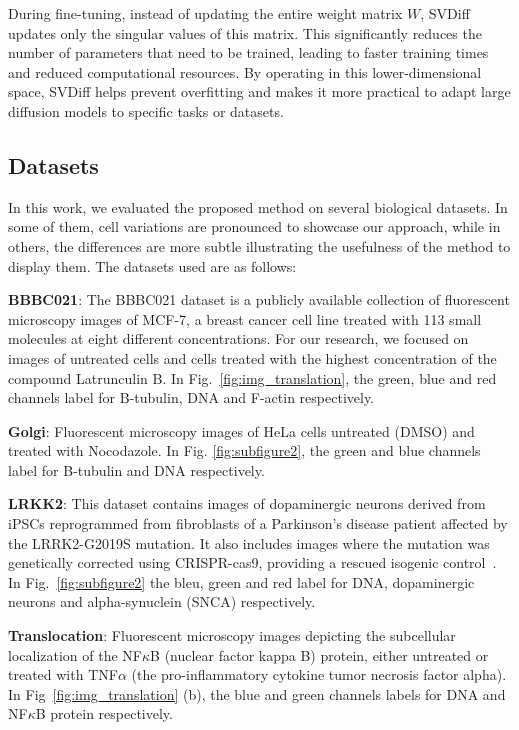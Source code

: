 During fine-tuning, instead of updating the entire weight matrix $W$, SVDiff updates only the singular values of this matrix. This significantly reduces the number of parameters that need to be trained, leading to faster training times and reduced computational resources. By operating in this lower-dimensional space, SVDiff helps prevent overfitting and makes it more practical to adapt large diffusion models to specific tasks or datasets.
\subsection{Datasets}
In this work, we evaluated the proposed method on several biological datasets. In some of them, cell variations are pronounced to showcase our approach, while in others, the differences are more subtle illustrating the usefulness of the method to display them. The datasets used are as follows:

\noindent \textbf{BBBC021}:
The BBBC021 dataset \cite{bbbc} is a publicly available collection of fluorescent microscopy images of MCF-7, a breast cancer cell line treated with 113 small molecules at eight different concentrations. For our research, we focused on images of untreated cells and cells treated with the highest concentration of the compound Latrunculin B. In Fig.~\ref{fig:img_translation}, the green, blue and red channels label for B-tubulin, DNA and F-actin respectively.

\noindent \textbf{Golgi}:
Fluorescent microscopy images of HeLa cells untreated (DMSO) and treated with Nocodazole. In Fig. \ref{fig:subfigure2}, the green and blue channels label for B-tubulin and DNA respectively.

\noindent \textbf{LRKK2}:
This dataset contains images of dopaminergic neurons derived from iPSCs reprogrammed from fibroblasts of a Parkinson's disease patient affected by the LRRK2-G2019S mutation. It also includes images where the mutation was genetically corrected using CRISPR-cas9, providing a rescued isogenic control~\cite{Lamiable2023}. In Fig.~\ref{fig:subfigure2} the bleu, green and red label for DNA, dopaminergic neurons and alpha-synuclein (SNCA) respectively.

\noindent \textbf{Translocation}:
Fluorescent microscopy images depicting the subcellular localization of the NF$\kappa$B (nuclear factor kappa B) protein, either untreated or treated with TNF$\alpha$ (the pro-inflammatory cytokine tumor necrosis factor alpha). In Fig~\ref{fig:img_translation} (b), the blue and green channels labels for DNA and NF$\kappa$B protein respectively.

